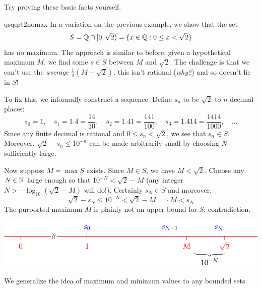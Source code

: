 Try proving these basic facts yourself.
\goodbreak


\begin{example}{}{qsqqrt2nomax}
	In a variation on the previous example, we show that the set
	\[
		S=\mathbb{Q}\cap[0,\sqrt 2)=\{x\in \mathbb{Q}:0\le x<\sqrt 2\}
	\]	
	has no maximum. The approach is similar to before: given a hypothetical maximum $M$, we find some $s\in S$ between $M$ and $\sqrt 2$. The challenge is that we can't use the \emph{average} $\frac 12(M+\sqrt 2)$: this isn't rational (\emph{why?}) and so doesn't lie in $S$!\smallbreak
	
	To fix this, we informally construct a sequence. Define $s_n$ to be $\sqrt 2$ to $n$ decimal places:
	\[
		s_0=1,\quad s_1=1.4=\frac{14}{10},\quad s_2=1.41=\frac{141}{100},\quad s_3=1.414=\frac{1414}{1000},\quad\ldots
	\]
	Since any finite decimal is rational and $0\le s_n<\sqrt 2$, we see that $s_n\in S$. Moreover, $\sqrt 2-s_n\le 10^{-n}$ can be made arbitrarily small by choosing $N$ sufficiently large.\par
	Now suppose $M=\max S$ exists. Since $M\in S$, we have $M<\sqrt 2$. Choose any $N\in\mathbb{N}$ large enough so that $10^{-N}<\sqrt 2-M$ (any integer $N>-\log_{10}(\sqrt 2-M)$ will do!). Certainly $s_N\in S$ and moreover,
	\[
		\sqrt 2 -s_N\le 10^{-N}<\sqrt 2-M\implies M<s_N
	\]
	The purported maximum $M$ is plainly not an upper bound for $S$: contradiction.
	\begin{center}
		\vspace{-5pt}
	  \includegraphics{nomax2}
	\end{center}
\end{example}




We generalize the idea of maximum and minimum values to any bounded sets.

